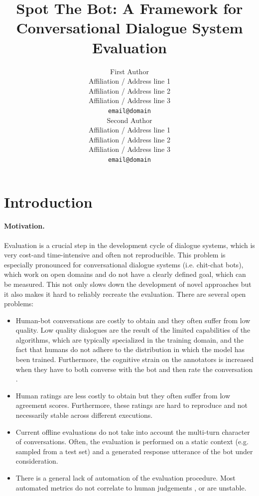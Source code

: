 \documentclass[11pt,a4paper]{article}
\title{Spot The Bot: A Framework for Conversational Dialogue System Evaluation}
\author{First Author \\
  Affiliation / Address line 1 \\
  Affiliation / Address line 2 \\
  Affiliation / Address line 3 \\
  \texttt{email@domain} \\\And
  Second Author \\
  Affiliation / Address line 1 \\
  Affiliation / Address line 2 \\
  Affiliation / Address line 3 \\
  \texttt{email@domain} \\}
\date{}
\begin{document}
\maketitle
\begin{abstract}

\end{abstract}

\section{Introduction}\label{sec:intro}
\paragraph{Motivation.}
Evaluation is a crucial step in the development cycle of dialogue systems, which is very cost-and time-intensive and often not reproducible. This problem is especially pronounced for conversational dialogue systems (i.e. chit-chat bots), which work on open domains and do not have a clearly defined goal, which can be measured. This not only slows down the development of novel approaches but it also makes it hard to reliably recreate the evaluation. 
There are several open problems: 
\begin{itemize}
\item  Human-bot conversations are costly to obtain and they often suffer from low quality. Low quality dialogues are the result of the limited capabilities of the algorithms, which are typically specialized in the training domain, and the fact that humans do not adhere to the distribution in which the model has been trained. Furthermore, the cognitive strain on the annotators is increased when they have to both converse with the bot and then rate the conversation \cite{}.
\item Human ratings are less costly to obtain but they often suffer from low agreement scores. Furthermore, these ratings are hard to reproduce and not necessarily stable across different executions. 
\item Current offline evaluations do not take into account the multi-turn character of conversations. Often, the evaluation is performed on a static context (e.g. sampled from a test set) and a generated response utterance of the bot under consideration. 
\item There is a general lack of automation of the evaluation procedure. Most automated metrics do not correlate to human judgements \cite{foster-2008-automated}, or are unstable.
\end{itemize}
\end{document}
